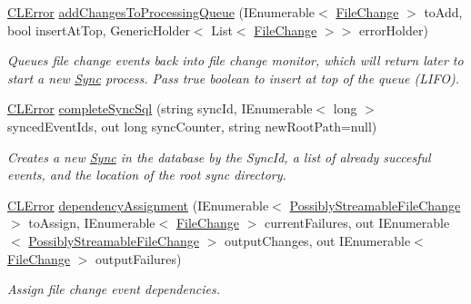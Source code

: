 \begin{DoxyCompactItemize}
\hyperlink{class_cloud_api_public_1_1_model_1_1_c_l_error}{C\-L\-Error} \hyperlink{class_cloud_api_public_1_1_file_monitor_1_1_sync_implementation_1_1_sync_data_adb4a731e081e547e94d2c911ee61a245}{add\-Changes\-To\-Processing\-Queue} (I\-Enumerable$<$ \hyperlink{class_cloud_api_public_1_1_model_1_1_file_change}{File\-Change} $>$ to\-Add, bool insert\-At\-Top, Generic\-Holder$<$ List$<$ \hyperlink{class_cloud_api_public_1_1_model_1_1_file_change}{File\-Change} $>$$>$ error\-Holder)
\begin{DoxyCompactList}\small\item\em Queues file change events back into file change monitor, which will return later to start a new \hyperlink{namespace_cloud_api_public_1_1_sync}{Sync} process. Pass true boolean to insert at top of the queue (L\-I\-F\-O). \end{DoxyCompactList}\item 
\hyperlink{class_cloud_api_public_1_1_model_1_1_c_l_error}{C\-L\-Error} \hyperlink{class_cloud_api_public_1_1_file_monitor_1_1_sync_implementation_1_1_sync_data_aad09654dd098ab18aa394e94b4854aea}{complete\-Sync\-Sql} (string sync\-Id, I\-Enumerable$<$ long $>$ synced\-Event\-Ids, out long sync\-Counter, string new\-Root\-Path=null)
\begin{DoxyCompactList}\small\item\em Creates a new \hyperlink{namespace_cloud_api_public_1_1_sync}{Sync} in the database by the Sync\-Id, a list of already succesful events, and the location of the root sync directory. \end{DoxyCompactList}\item 
\hyperlink{class_cloud_api_public_1_1_model_1_1_c_l_error}{C\-L\-Error} \hyperlink{class_cloud_api_public_1_1_file_monitor_1_1_sync_implementation_1_1_sync_data_a63f746aa419f942aed5d24dae837822a}{dependency\-Assignment} (I\-Enumerable$<$ \hyperlink{struct_cloud_api_public_1_1_model_1_1_possibly_streamable_file_change}{Possibly\-Streamable\-File\-Change} $>$ to\-Assign, I\-Enumerable$<$ \hyperlink{class_cloud_api_public_1_1_model_1_1_file_change}{File\-Change} $>$ current\-Failures, out I\-Enumerable$<$ \hyperlink{struct_cloud_api_public_1_1_model_1_1_possibly_streamable_file_change}{Possibly\-Streamable\-File\-Change} $>$ output\-Changes, out I\-Enumerable$<$ \hyperlink{class_cloud_api_public_1_1_model_1_1_file_change}{File\-Change} $>$ output\-Failures)
\begin{DoxyCompactList}\small\item\em Assign file change event dependencies. \end{DoxyCompactList}\item 
$$
\end{DoxyCompactItemize}
